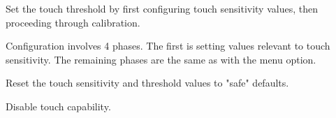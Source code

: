  \par\medskip

Set the touch threshold by first configuring touch sensitivity values, then
proceeding through calibration.

\par\medskip

Configuration involves \num{4} phases.  The first is setting values relevant to
touch sensitivity.  The remaining phases are the same as with the  menu
option.


 \par\medskip

Reset the touch sensitivity and threshold values to "safe" defaults.


 \par\medskip

Disable touch capability.


